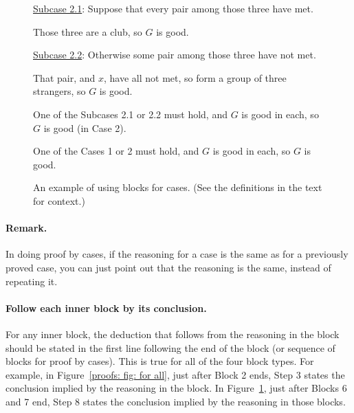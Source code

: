 \begin{figure}
\begin{framed}
\begin{longFormProof}
\begin{block}[proofs: C2]
    \begin{block}[proofs: C2A]
      \step \underline{Subcase 2.1}: Suppose that every pair among those three have met. 

      \step Those three are a club, so $G$ is good.
    \end{block}
    
    \begin{block}[proofs: C2B]
      \step \underline{Subcase 2.2}: Otherwise some pair among those three have not met.
      
      \step That pair, and $x$, have all not met, so form a group of three strangers, so $G$ is good.
    \end{block}
    \step One of the Subcases 2.1 or 2.2 must hold, and $G$ is good in each, so $G$ is good (in Case 2). 
  \end{block}
  
  \step One of the Cases 1 or 2 must hold, and $G$ is good in each, so $G$ is good.

\end{longFormProof}
\vspace*{-10pt}
\end{framed}
\vspace*{-10pt}
\caption{An example of using blocks for cases. (See the definitions in the text for context.)}\label{proofs: fig: cases}
\end{figure}

\paragraph{Remark.} 
In doing proof by cases, if the reasoning for a case
is the same as for a previously proved case,
you can just point out that the reasoning is the same,
instead of repeating it.

\paragraph{Follow each inner block by its conclusion.}
For any inner block,
the deduction that follows from the reasoning in the block
should be stated in the first line following the end of the block
(or sequence of blocks for proof by cases).
This is true for all of the four block types.
For example, in Figure~\ref{proofs: fig: for all}, just after Block 2 ends, 
Step 3 states the conclusion implied by the reasoning in the block. 
In Figure~\ref{proofs: fig: cases}, just after Blocks 6 and 7 end, 
Step 8 states the conclusion implied by the reasoning in those blocks. 

